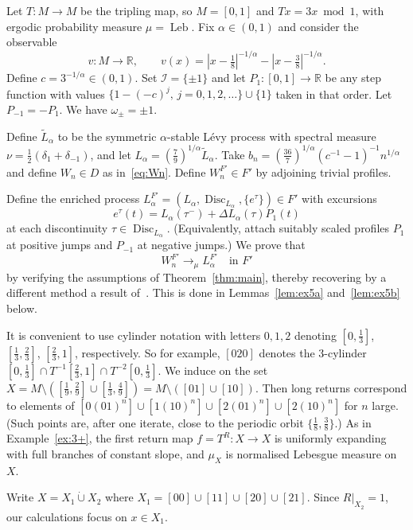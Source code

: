\documentclass[12pt]{article}
\numberwithin{equation}{section}
\newcommand{\R}{{\mathbb R}}
\newcommand{\cI}{{\mathcal I}}
\newcommand{\tL}{{\tilde L}}
\newcommand{\Leb}{\operatorname{Leb}}
\newcommand{\disc}{\operatorname{Disc}}
\begin{document}
\begin{example} \label{ex:5+}
Let $T:M\to M$ be the tripling map, so $M=[0,1]$ and 
$Tx=3x\bmod1$, with ergodic probability measure $\mu=\Leb$.
Fix $\alpha\in(0,1)$ and consider the observable 
\[
v:M\to\R, \qquad v(x)=|x-\tfrac18|^{-1/\alpha}-|x-\tfrac38|^{-1/\alpha}.
\]
Define $c=3^{-1/\alpha}\in(0,1)$.
Set $\cI=\{\pm1\}$ and let $P_1:[0,1]\to\R$ be any step function
with values $\{1-(-c)^j,\,j=0,1,2,\dots\}\cup\{1\}$ taken in that order.
Let $P_{-1}=-P_1$. We have $\omega_\pm=\pm1$.

Define $\tL_\alpha$ to be the symmetric $\alpha$-stable L\'evy process with
spectral measure $\nu=\frac{1}{2}(\delta_1+\delta_{-1})$, and 
let $L_\alpha=(\tfrac79)^{1/\alpha}\tL_\alpha$.
Take $b_n=(\frac{36}{7})^{1/\alpha}(c^{-1}-1)^{-1}n^{1/\alpha}$ and define $W_n\in D$ as in~\eqref{eq:Wn}.
Define $W_n^{F'}\in F'$ by adjoining trivial profiles.

Define the enriched process
$L_\alpha^{F'}=(L_\alpha,\disc_{L_\alpha},\{e^\tau\})\in F'$ with excursions
\[
e^\tau(t)=L_\alpha(\tau^-)+\Delta L_\alpha(\tau)P_1(t)
\]
at each discontinuity $\tau\in \disc_{L_\alpha}$.
(Equivalently, attach suitably scaled profiles $P_1$ at positive jumps and $P_{-1}$ at negative jumps.)
We prove that 
\[
W_n^{F'}\to_\mu L_\alpha^{F'} \quad\text{in $F'$}
\]
by verifying the assumptions of Theorem~\ref{thm:main}, thereby recovering by a different method a result of~\cite[Example 2.7]{Freitas2Toddsub}.
This is done in Lemmas~\ref{lem:ex5a} and~\ref{lem:ex5b} below.



\vspace{1ex}
It is convenient to use
cylinder notation with letters $0,1,2$ denoting
$[0,\frac13]$,
$[\frac13,\frac23]$,
$[\frac23,1]$,
respectively.
So for example,
$[020]$ denotes the $3$-cylinder
$[0,\frac13]\cap T^{-1}[\frac23,1]\cap T^{-2}[0,\frac13]$.
We induce on the set 
$X=M\setminus([\frac19,\frac29]\cup[\frac13,\frac49])=
M\setminus([01]\cup[10])$.
Then long returns correspond to elements of
$[0(01)^n]\cup[1(10)^n]\cup[2(01)^n]\cup[2(10)^n]$ for $n$ large.
(Such points are, after one iterate, close to the periodic orbit $\{\frac18,\tfrac38\}$.)
As in Example~\ref{ex:3+}, the first return map $f=T^R:X\to X$ is uniformly expanding with full branches of constant slope,
and $\mu_X$ is normalised Lebesgue measure on $X$.

Write $X=X_1\dot\cup X_2$ where
$X_1=[00]\cup[11]\cup[20]\cup[21]$.
Since $R|_{X_2}=1$, our calculations focus on $x\in X_1$.


\end{example}
\end{document}
